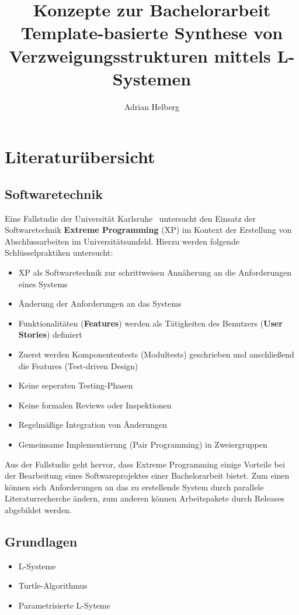 \documentclass[11pt]{article}
\title{\textbf{Konzepte} zur Bachelorarbeit\\\large{Template-basierte Synthese von\\Verzweigungsstrukturen mittels
L-Systemen}}
\author{Adrian Helberg}
\begin{document}
    \maketitle
    \tableofcontents
    \newpage
    \section{Literaturübersicht}
    \subsection{Softwaretechnik}
    Eine Fallstudie der Universität Karlsruhe~\cite{1} untersucht den Einsatz der Softwaretechnik \textbf{Extreme
    Programming}
    (XP) im Kontext der Erstellung von Abschlussarbeiten im Universitätsumfeld.
    Hierzu werden folgende Schlüsselpraktiken untersucht:
    \begin{itemize}
        \item XP als Softwaretechnik zur schrittweisen Annäherung an die Anforderungen eines Systems
        \item Änderung der Anforderungen an das Systems
        \item Funktionalitäten (\textbf{Features}) werden als Tätigkeiten des Benutzers (\textbf{User Stories}) definiert
        \item Zuerst werden Komponententests (Modultests) geschrieben und anschließend die Features (Test-driven Design)
        \item Keine seperaten Testing-Phasen
        \item Keine formalen Reviews oder Inspektionen
        \item Regelmäßige Integration von Änderungen
        \item Gemeinsame Implementierung (Pair Programming) in Zweiergruppen
    \end{itemize}
    Aus der Fallstudie geht hervor, dass Extreme Programming einige Vorteile bei der Bearbeitung eines Softwareprojektes
    einer Bachelorarbeit bietet.
    Zum einen können sich Anforderungen an das zu erstellende System durch parallele Literaturrecherche ändern, zum
    anderen können Arbeitspakete durch Releases abgebildet werden.

    \subsection{Grundlagen}
    \begin{itemize}
        \item L-Systeme~\cite{3}
        \item Turtle-Algorithmus~\cite{4}
        \item Parametrisierte L-Syteme~\cite{5}
    \end{itemize}
\end{document}
